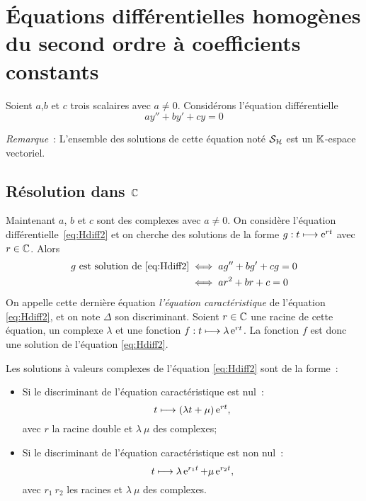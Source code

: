 \section{Équations différentielles homogènes du second ordre à coefficients constants}
\label{sec:eqdiffsecondordrecoefconstants}
Soient $a$,$b$ et $c$ trois scalaires avec $a \neq 0$. Considérons l'équation différentielle
\begin{equation}
  \label{eq:Hdiff2}
  ay''+by'+cy=0
\end{equation}

\emph{Remarque}~: L'ensemble des solutions de cette équation noté $\mathcal{S}_{\mathcal{H}}$ est un $\mathbb{K}$-espace vectoriel.
%
\subsection{Résolution dans $\mathbb{C}$}
\label{subsec:resdansC}
Maintenant $a$, $b$ et $c$ sont des complexes avec $a \neq 0$. On considère l'équation différentielle~\eqref{eq:Hdiff2} et on cherche des solutions de la forme $g :t \longmapsto \operatorname{e}^{rt}$ avec $r \in \mathbb{C}$. Alors 
\begin{align}
  g\text{~est solution de } \eqref{eq:Hdiff2} & \iff ag'' + bg'+cg=0  \\ & \iff ar^2+br+c=0
\end{align}
On appelle cette dernière équation \emph{l'équation caractéristique} de l'équation \eqref{eq:Hdiff2}, et on note $\Delta$ son discriminant. Soient $r \in \mathbb{C}$ une racine de cette équation, un complexe $\lambda$ et une fonction $f:t \longmapsto \lambda \operatorname{e}^{rt}$. La fonction $f$ est donc une solution de l'équation \eqref{eq:Hdiff2}.
%
\begin{theo}
  \label{theo:5} 
  Les solutions à valeurs complexes de l'équation \eqref{eq:Hdiff2} sont de la forme~:
  \begin{itemize}
  \item Si le discriminant de l'équation caractéristique est nul~: 
    \begin{equation} 
      t \longmapsto (\lambda t + \mu)\operatorname{e}^{rt},
    \end{equation} 
    avec $r$ la racine double et $\lambda \ \mu$ des complexes;
  \item Si le discriminant de l'équation caractéristique est non nul~: 
    \begin{equation} 
      t \longmapsto \lambda \operatorname{e}^{r_1 t} + \mu \operatorname{e}^{r_2 t},
    \end{equation} 
    avec $r_1 \ r_2$ les racines et $\lambda \ \mu$ des complexes.
  \end{itemize}
\end{theo}
